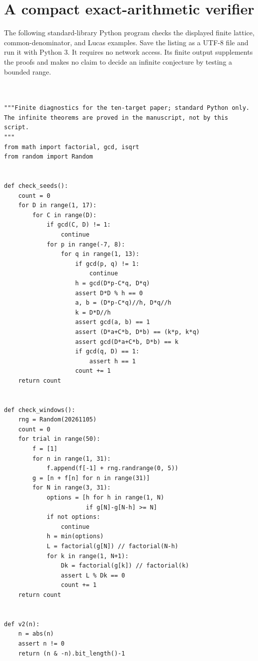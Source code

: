 \documentclass[11pt,a4paper]{article}
\numberwithin{equation}{section}
\theoremstyle{definition}
\theoremstyle{remark}
\begin{document}
\clearpage
\appendix
\section{A compact exact-arithmetic verifier}
\label{app:verify}

The following standard-library Python program checks the displayed
finite lattice, common-denominator, and Lucas examples. Save the listing
as a UTF-8 file and run it with Python 3. It requires no network access.
Its finite output supplements the proofs and makes no claim to decide
an infinite conjecture by testing a bounded range.

\begin{lstlisting}[style=certificate]


"""Finite diagnostics for the ten-target paper; standard Python only.
The infinite theorems are proved in the manuscript, not by this script.
"""
from math import factorial, gcd, isqrt
from random import Random


def check_seeds():
    count = 0
    for D in range(1, 17):
        for C in range(D):
            if gcd(C, D) != 1:
                continue
            for p in range(-7, 8):
                for q in range(1, 13):
                    if gcd(p, q) != 1:
                        continue
                    h = gcd(D*p-C*q, D*q)
                    assert D*D % h == 0
                    a, b = (D*p-C*q)//h, D*q//h
                    k = D*D//h
                    assert gcd(a, b) == 1
                    assert (D*a+C*b, D*b) == (k*p, k*q)
                    assert gcd(D*a+C*b, D*b) == k
                    if gcd(q, D) == 1:
                        assert h == 1
                    count += 1
    return count


def check_windows():
    rng = Random(20261105)
    count = 0
    for trial in range(50):
        f = [1]
        for n in range(1, 31):
            f.append(f[-1] + rng.randrange(0, 5))
        g = [n + f[n] for n in range(31)]
        for N in range(3, 31):
            options = [h for h in range(1, N)
                       if g[N]-g[N-h] >= N]
            if not options:
                continue
            h = min(options)
            L = factorial(g[N]) // factorial(N-h)
            for k in range(1, N+1):
                Dk = factorial(g[k]) // factorial(k)
                assert L % Dk == 0
                count += 1
    return count


def v2(n):
    n = abs(n)
    assert n != 0
    return (n & -n).bit_length()-1



\end{lstlisting}
\end{document}
